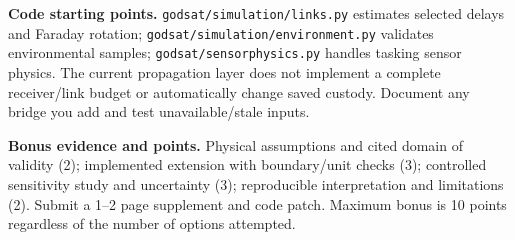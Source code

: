 \documentclass[11pt,letterpaper]{article}
\newcommand{\code}[1]{\texttt{\small #1}}
\begin{document}
\textbf{Code starting points.} \code{godsat/simulation/links.py} estimates selected delays and Faraday rotation; \code{godsat/simulation/environment.py} validates environmental samples; \code{godsat/sensorphysics.py} handles tasking sensor physics. The current propagation layer does not implement a complete receiver/link budget or automatically change saved custody. Document any bridge you add and test unavailable/stale inputs.

\textbf{Bonus evidence and points.} Physical assumptions and cited domain of validity (2); implemented extension with boundary/unit checks (3); controlled sensitivity study and uncertainty (3); reproducible interpretation and limitations (2). Submit a 1--2 page supplement and code patch. Maximum bonus is 10 points regardless of the number of options attempted.
\end{document}
